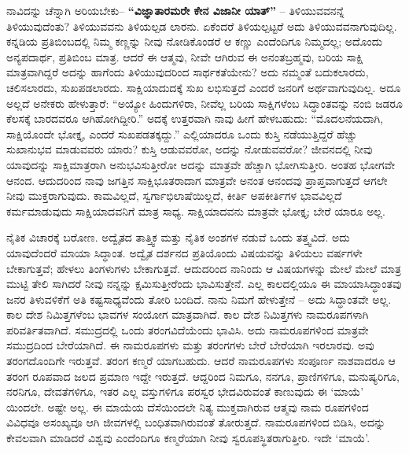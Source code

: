 ನಾವಿದನ್ನು ಚೆನ್ನಾಗಿ ಅರಿಯಬೇಕು– \textbf{“ವಿಜ್ಞಾತಾರಮರೇ ಕೇನ ವಿಜಾನೀ ಯಾತ್​”} – ತಿಳಿಯುವವನನ್ನೆ ತಿಳಿಯುವುದೆಂತು? ತಿಳಿಯುವವನು ತಿಳಿಯಲ್ಪಡ ಲಾರನು. ಏಕೆಂದರೆ ತಿಳಿಯಲ್ಪಟ್ಟರೆ ಅದು ತಿಳಿಯುವವನಾಗುವುದಿಲ್ಲ. ಕನ್ನಡಿಯ ಪ್ರತಿಬಿಂಬದಲ್ಲಿ ನಿಮ್ಮ ಕಣ್ಣನ್ನು ನೀವು ನೋಡಿಕೊಂಡರೆ ಆ ಕಣ್ಣು ಎಂದೆಂದಿಗೂ ನಿಮ್ಮದಲ್ಲ; ಅದೊಂದು ಅನ್ಯಪದಾರ್ಥ, ಪ್ರತಿಬಿಂಬ ಮಾತ್ರ. ಆದರೆ ಈ ಆತ್ಮವು, ನೀವೇ ಆಗಿರುವ ಈ ಅನಂತಬ್ರಹ್ಮವು, ಬರಿಯ ಸಾಕ್ಷಿ ಮಾತ್ರವಾಗಿದ್ದರೆ ಅದನ್ನು ಹಾಗೆಂದು ತಿಳಿಯುವುದರಿಂದ ಸಾರ್ಥಕತೆಯೇನು? ಅದು ನಮ್ಮಂತೆ ಬದುಕಲಾರದು, ಚಲಿಸಲಾರದು, ಸುಖಪಡಲಾರದು. ಸಾಕ್ಷಿಯಾದುದಕ್ಕೆ ಸುಖ ಲಭಿಸುತ್ತದೆ ಎಂದರೆ ಜನರಿಗೆ ಅರ್ಥವಾಗುವುದಿಲ್ಲ. ಅದೂ ಅಲ್ಲದೆ ಅನೇಕರು ಹೇಳುತ್ತಾರೆ: “ಅಯ್ಯೋ ಹಿಂದುಗಳಿರಾ, ನೀವೆಲ್ಲ ಬರಿಯ ಸಾಕ್ಷಿಗಳೆಂಬ ಸಿದ್ಧಾಂತವನ್ನು ನಂಬಿ ಜಡರೂ ಕೆಲಸಕ್ಕೆ ಬಾರದವರೂ ಆಗಿಹೋಗಿದ್ದೀರಿ.” ಅದಕ್ಕೆ ಉತ್ತರವಾಗಿ ನಾವು ಹೀಗೆ ಹೇಳಬಹುದು: “ಮೊದಲನೆಯದಾಗಿ, ಸಾಕ್ಷಿಯೊಂದೇ ಭೋಕ್ತೃ, ಎಂದರೆ ಸುಖಪಡತಕ್ಕದ್ದು.” ಎಲ್ಲಿಯಾದರೂ ಒಂದು ಕುಸ್ತಿ ನಡೆಯುತ್ತಿದ್ದರೆ ಹೆಚ್ಚು ಸುಖಾನುಭವ ಮಾಡುವವರು ಯಾರು? ಕುಸ್ತಿ ಆಡುವವರೋ, ಅದನ್ನು ನೋಡುವವರೋ? ಜೀವನದಲ್ಲಿ ನೀವು ಯಾವುದನ್ನು ಸಾಕ್ಷಿಮಾತ್ರರಾಗಿ ಅನುಭವಿಸುತ್ತೀರೋ ಅದನ್ನು ಮಾತ್ರವೇ ಹೆಚ್ಚಾಗಿ ಭೋಗಿಸುತ್ತೀರಿ. ಅಂತಹ ಭೋಗವೇ ಆನಂದ. ಆದುದರಿಂದ ನಾವು ಜಗತ್ತಿನ ಸಾಕ್ಷಿಭೂತರಾದಾಗ ಮಾತ್ರವೇ ಅನಂತ ಆನಂದವು ಪ್ರಾಪ್ತವಾಗುತ್ತದೆ ಆಗಲೇ ನೀವು ಮುಕ್ತರಾಗುವುದು. ಕಾಮವಿಲ್ಲದೆ, ಸ್ವರ್ಗಾಭಿಲಾಷೆಯಿಲ್ಲದೆ, ಕೀರ್ತಿ ಅಪಕೀರ್ತಿಗಳ ಭಾವವಿಲ್ಲದೆ ಕರ್ಮಮಾಡುವುದು ಸಾಕ್ಷಿಯಾದವನಿಗೆ ಮಾತ್ರ ಸಾಧ್ಯ. ಸಾಕ್ಷಿಯಾದವನು ಮಾತ್ರವೇ ಭೋಕ್ತೃ; ಬೇರೆ ಯಾರೂ ಅಲ್ಲ.

ನೈತಿಕ ವಿಚಾರಕ್ಕೆ ಬರೋಣ. ಅದ್ವೈತದ ತಾತ್ತ್ವಿಕ ಮತ್ತು ನೈತಿಕ ಅಂಶಗಳ ನಡುವೆ ಒಂದು ತತ್ತ್ವವಿದೆ. ಅದು ಯಾವುದೆಂದರೆ ಮಾಯಾ ಸಿದ್ಧಾಂತ. ಅದ್ವೈತ ದರ್ಶನದ ಪ್ರತಿಯೊಂದು ವಿಷಯವನ್ನು ತಿಳಿಯಲು ವರ್ಷಗಳೇ ಬೇಕಾಗುತ್ತವೆ; ಹೇಳಲು ತಿಂಗಳುಗಳು ಬೇಕಾಗುತ್ತವೆ. ಆದುದರಿಂದ ನಾನಿಂದು ಆ ವಿಷಯಗಳನ್ನು ಮೇಲೆ ಮೇಲೆ ಮಾತ್ರ ಮುಟ್ಟಿ ತೇಲಿ ಸಾಗಿದರೆ ನೀವು ನನ್ನನ್ನು ಕ್ಷಮಿಸುತ್ತೀರೆಂದು ಭಾವಿಸುತ್ತೇನೆ. ಎಲ್ಲ ಕಾಲದಲ್ಲಿಯೂ ಈ ಮಾಯಾಸಿದ್ಧಾಂತವು ಜನರ ತಿಳುವಳಿಕೆಗೆ ಅತಿ ಕಷ್ಟಸಾಧ್ಯವೆಂದು ತೋರಿ ಬಂದಿದೆ. ನಾನು ನಿಮಗೆ ಹೇಳುತ್ತೇನೆ – ಅದು ಸಿದ್ಧಾಂತವೇ ಅಲ್ಲ. ಕಾಲ ದೇಶ ನಿಮಿತ್ತಗಳೆಂಬ ಭಾವಗಳ ಸಂಯೋಗ ಮಾತ್ರವಾಗಿದೆ. ಕಾಲ ದೇಶ ನಿಮಿತ್ತಗಳು ನಾಮರೂಪಗಳಾಗಿ ಪರಿವರ್ತಿತವಾಗಿದೆ. ಸಮುದ್ರದಲ್ಲಿ ಒಂದು ತರಂಗವಿದೆಯೆಂದು ಭಾವಿಸಿ. ಅದು ನಾಮರೂಪಗಳಿಂದ ಮಾತ್ರವೇ ಸಮುದ್ರದಿಂದ ಬೇರೆಯಾಗಿದೆ. ಈ ನಾಮರೂಪಗಳು ಮತ್ತು ತರಂಗಗಳು ಬೇರೆ ಬೇರೆಯಾಗಿ ಇರಲಾರವು. ಅವು ತರಂಗದೊಂದಿಗೇ ಇರುತ್ತವೆ. ತರಂಗ ಕಣ್ಮರೆ ಯಾಗಬಹುದು. ಆದರೆ ನಾಮರೂಪಗಳು ಸಂಪೂರ್ಣ ನಾಶವಾದರೂ ಆ ತರಂಗ ರೂಪವಾದ ಜಲದ ಪ್ರಮಾಣ ಇದ್ದೇ ಇರುತ್ತದೆ. ಆದ್ದರಿಂದ ನಿಮಗೂ, ನನಗೂ, ಪ್ರಾಣಿಗಳಿಗೂ, ಮನುಷ್ಯರಿಗೂ, ನರನಿಗೂ, ದೇವತೆಗಳಿಗೂ, ಇತರ ಎಲ್ಲ ವಸ್ತುಗಳಿಗೂ ಪರಸ್ವರ ಭೇದವಿರುವಂತೆ ಕಾಣುವುದು ಈ ‘ಮಾಯೆ’ ಯಿಂದಲೇ. ಅಷ್ಟೇ ಅಲ್ಲ. ಈ ಮಾಯೆಯ ದೆಸೆಯಿಂದಲೇ ನಿತ್ಯ ಮುಕ್ತವಾಗಿರುವ ಆತ್ಮವು ನಾಮ ರೂಪಗಳಿಂದ ವಿವಿಧವೂ ಅಸಂಖ್ಯವೂ ಆಗಿ ಜೀವಗಳಲ್ಲಿ ಬಂಧಿತವಾಗಿರುವಂತೆ ತೋರುತ್ತದೆ. ನಾಮರೂಪಗಳಿಂದ ಬಿಡಿಸಿ, ಅದನ್ನು ಕೇವಲವಾಗಿ ಮಾಡಿದರೆ ವಿಶ್ವವು ಎಂದೆಂದಿಗೂ ಕಣ್ಮರೆಯಾಗಿ ನೀವು ಸ್ವರೂಪಸ್ಥಿತರಾಗುತ್ತೀರಿ. ಇದೇ ‘ಮಾಯೆ’.

